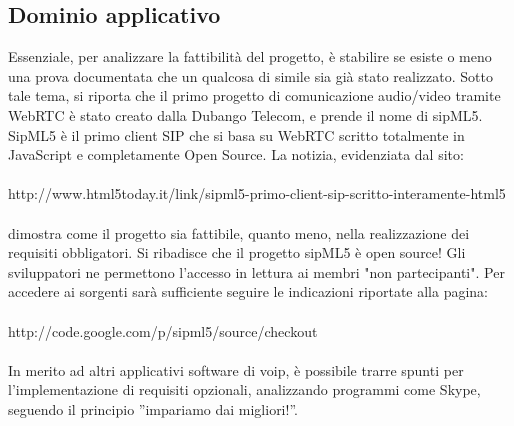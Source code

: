 \subsection{Dominio applicativo}
Essenziale, per analizzare la fattibilità del progetto, è stabilire se esiste o meno una prova documentata che un qualcosa di simile sia già stato realizzato. Sotto tale tema, si riporta che il primo progetto di comunicazione audio/video tramite WebRTC è stato creato dalla Dubango Telecom, e prende il nome di sipML5. SipML5 è il primo client SIP che si basa su WebRTC scritto totalmente in JavaScript e completamente Open Source. La notizia, evidenziata dal sito:\\\\ http://www.html5today.it/link/sipml5-primo-client-sip-scritto-interamente-html5\\\\ dimostra come il progetto sia fattibile, quanto meno, nella realizzazione dei requisiti obbligatori. Si ribadisce che il progetto sipML5 è open source! Gli sviluppatori ne permettono l'accesso in lettura ai membri "non partecipanti". Per accedere ai sorgenti sarà sufficiente seguire le indicazioni riportate alla pagina:\\\\ http://code.google.com/p/sipml5/source/checkout\\\\ In merito ad altri applicativi software di voip, è possibile trarre spunti per l'implementazione di requisiti opzionali, analizzando programmi come Skype, seguendo il principio ''impariamo dai migliori!''.

